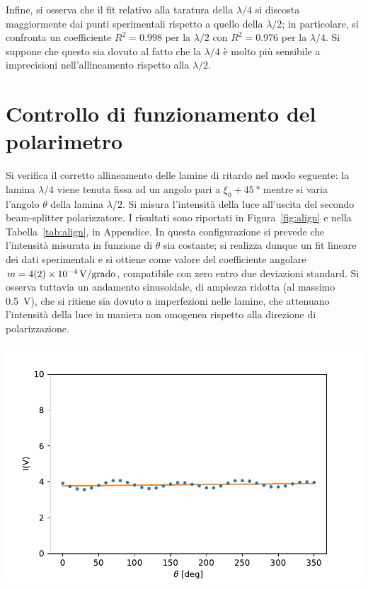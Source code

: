 \documentclass[10pt,oneside,a4paper]{article}
\newenvironment{Figure}
  {\par\medskip\noindent\minipage{\linewidth}}
  {\endminipage\par\medskip}
\begin{document}
\begin{multicols}{2}
Infine, si osserva che il fit relativo alla taratura della $\lambda/4$ si discosta maggiormente dai punti sperimentali rispetto a quello della $\lambda/2$; in particolare, si confronta un coefficiente $R^2 = 0.998$ per la $\lambda/2$ con $R^2 = 0.976$ per la $\lambda/4$. Si suppone che questo sia dovuto al fatto che la $\lambda/4$ è molto più sensibile a imprecisioni nell'allineamento rispetto alla $\lambda/2$.


\section{Controllo di funzionamento del polarimetro}

Si verifica il corretto allineamento delle lamine di ritardo nel modo seguente: la lamina $\lambda/4$ viene tenuta fissa ad un angolo pari a $\xi_0 + 45\SI{}{\degree}$ mentre si varia l'angolo $\theta$ della lamina $\lambda/2$. Si misura l'intensità della luce all'uscita del secondo beam-splitter polarizzatore. I risultati sono riportati in Figura~\ref{fig:align} e nella Tabella~\ref{tab:align}, in Appendice. In questa configurazione si prevede che l'intensità misurata in funzione di $\theta$ sia costante; si realizza dunque un fit lineare dei dati sperimentali e si ottiene come valore del coefficiente angolare $m = \SI{4 \pm 2 e-4}{V / \text{grado}}$, compatibile con zero entro due deviazioni standard. Si osserva tuttavia un andamento sinusoidale, di ampiezza ridotta (al massimo \SI{0.5}{V}), che si ritiene sia dovuto a imperfezioni nelle lamine, che attenuano l'intensità della luce in maniera non omogenea rispetto alla direzione di polarizzazione. 

\begin{Figure}
	\begin{center}
	\includegraphics[width=0.9\linewidth]{align.pdf}
	\label{fig:align}
	\end{center}
\end{Figure}



\end{multicols}
\end{document}
